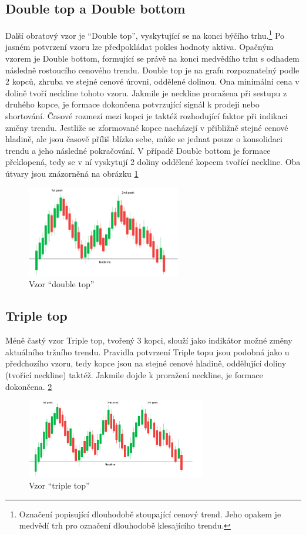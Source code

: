\subsection{Double top a Double bottom}
Další obratový vzor je \enquote{Double top}, vyskytující se na konci býčího trhu.\footnote{Označení popisující dlouhodobě stoupající cenový trend. Jeho opakem je medvědí trh pro označení
    dlouhodobě klesajícího trendu.} Po jasném potvrzení vzoru lze předpokládat pokles hodnoty aktiva. Opačným vzorem je Double bottom, formující se právě na konci medvědího trhu
s odhadem následně rostoucího cenového trendu. Double top je na grafu rozpoznatelný podle 2 kopců, zhruba ve stejné cenové úrovni, oddělené dolinou. Ona minimální cena v dolině
tvoří neckline tohoto vzoru. Jakmile je neckline proražena při sestupu z druhého kopce, je formace dokončena potvrzující signál k prodeji nebo shortování. Časové rozmezí mezi
kopci je taktéž rozhodující faktor při indikaci změny trendu. Jestliže se zformované kopce nacházejí v přibližně stejné cenové hladině, ale jsou časově příliš blízko sebe, může se jednat
pouze o konsolidaci trendu a jeho následné pokračování.
V případě Double bottom je formace překlopená, tedy se v ní vyskytují 2 doliny oddělené kopcem tvořící neckline. Oba útvary jsou znázorněná na obrázku \ref{fig:double-top}
\begin{figure}[htb]
    \centering
    \includegraphics[width=0.6\textwidth]{Figures/double-top.pdf}
    \caption{Vzor \enquote{double top}}
    \label{fig:double-top}
\end{figure}

\subsection{Triple top}
Méně častý vzor Triple top, tvořený 3 kopci, slouží jako indikátor možné změny aktuálního tržního trendu. Pravidla potvrzení Triple topu jsou podobná jako u předchozího vzoru, tedy
kopce jsou na stejné cenové hladině, oddělující doliny (tvořící neckline) taktéž. Jakmile dojde k proražení neckline, je formace dokončena. \ref{fig:triple-top}
\begin{figure}[htb]
    \centering
    \includegraphics[width=0.7\textwidth]{Figures/triple-top.pdf}
    \caption{Vzor \enquote{triple top}}
    \label{fig:triple-top}
\end{figure}

